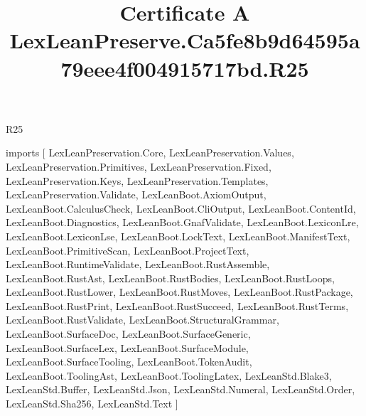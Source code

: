 \begin{lexlean}{R25}
\title{Certificate A LexLeanPreserve.Ca5fe8b9d64595a79eee4f004915717bd.R25}
\begin{coremodule}
imports [
  LexLeanPreservation.Core,
  LexLeanPreservation.Values,
  LexLeanPreservation.Primitives,
  LexLeanPreservation.Fixed,
  LexLeanPreservation.Keys,
  LexLeanPreservation.Templates,
  LexLeanPreservation.Validate,
  LexLeanBoot.AxiomOutput,
  LexLeanBoot.CalculusCheck,
  LexLeanBoot.CliOutput,
  LexLeanBoot.ContentId,
  LexLeanBoot.Diagnostics,
  LexLeanBoot.GnafValidate,
  LexLeanBoot.LexiconLre,
  LexLeanBoot.LexiconLse,
  LexLeanBoot.LockText,
  LexLeanBoot.ManifestText,
  LexLeanBoot.PrimitiveScan,
  LexLeanBoot.ProjectText,
  LexLeanBoot.RuntimeValidate,
  LexLeanBoot.RustAssemble,
  LexLeanBoot.RustAst,
  LexLeanBoot.RustBodies,
  LexLeanBoot.RustLoops,
  LexLeanBoot.RustLower,
  LexLeanBoot.RustMoves,
  LexLeanBoot.RustPackage,
  LexLeanBoot.RustPrint,
  LexLeanBoot.RustSucceed,
  LexLeanBoot.RustTerms,
  LexLeanBoot.RustValidate,
  LexLeanBoot.StructuralGrammar,
  LexLeanBoot.SurfaceDoc,
  LexLeanBoot.SurfaceGeneric,
  LexLeanBoot.SurfaceLex,
  LexLeanBoot.SurfaceModule,
  LexLeanBoot.SurfaceTooling,
  LexLeanBoot.TokenAudit,
  LexLeanBoot.ToolingAst,
  LexLeanBoot.ToolingLatex,
  LexLeanStd.Blake3,
  LexLeanStd.Buffer,
  LexLeanStd.Json,
  LexLeanStd.Numeral,
  LexLeanStd.Order,
  LexLeanStd.Sha256,
  LexLeanStd.Text
]


\end{coremodule}
\end{lexlean}
